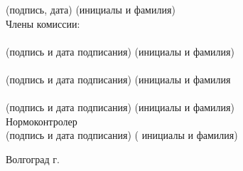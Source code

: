 \begin{titlepage}
\begin{flushleft}
            \vspace{-0.2cm}\hspace{8cm}\footnotesize(подпись, дата)
            \hspace{3cm}(инициалы и фамилия)\normalsize\\
            \vspace{1cm}
        Члены комиссии:\\
        \hspace{0.2cm}\underline{\hspace{5cm}}\hspace{0.5cm}\underline{\hspace{6cm}}\\
            \vspace{-0.2cm}\hspace{0.5cm}\footnotesize(подпись и дата подписания)\hspace{2cm}
            (инициалы и фамилия)\\
        \hspace{0.2cm}\underline{\hspace{5cm}}\hspace{0.5cm}\underline{\hspace{6cm}}\\
            \vspace{-0.2cm}\hspace{0.5cm}\footnotesize(подпись и дата подписания)\hspace{2cm}
            (инициалы и фамилия\\
        \hspace{0.2cm}\underline{\hspace{5cm}}\hspace{0.5cm}\underline{\hspace{6cm}}\\
            \vspace{-0.2cm}\hspace{0.5cm}\footnotesize(подпись и дата подписания)\hspace{2cm}
            (инициалы и фамилия)\normalsize\\
        \vspace{2cm}
        Нормоконтролер \underline{\hspace{5cm}}\hspace{0.5cm}\underline{\hspace{7cm}}\\
            \vspace{-0.2cm}\hspace{4.2cm}\footnotesize(подпись и дата подписания)\hspace{2cm}
        (   инициалы и фамилия)\normalsize\\
    \end{flushleft}
    \vspace{\fill}
    \begin{center}
        Волгоград \the\year г.
    \end{center}
\end{titlepage}
